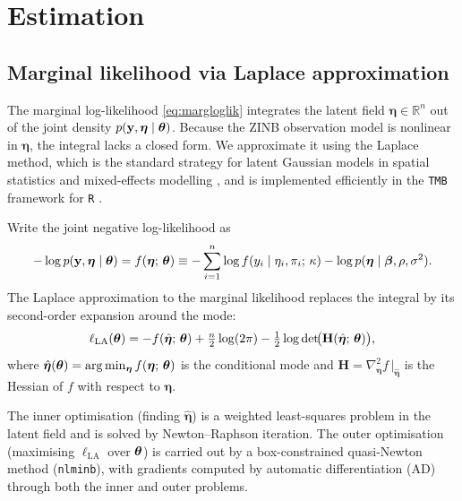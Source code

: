 \section{Estimation}\label{sec:estimation}

\subsection{Marginal likelihood via Laplace approximation}\label{sec:est_laplace}

The marginal log-likelihood \eqref{eq:margloglik} integrates the latent field $\boldsymbol{\eta} \in \mathbb{R}^n$ out of the joint density $p(\mathbf{y},\boldsymbol{\eta}\mid\boldsymbol{\theta})$.
Because the ZINB observation model is nonlinear in $\boldsymbol{\eta}$, the integral lacks a closed form.
We approximate it using the Laplace method, which is the standard strategy for latent Gaussian models in spatial statistics \citep{rue_martino_chopin2009} and mixed-effects modelling \citep{brooks2017}, and is implemented efficiently in the \texttt{TMB} framework for \texttt{R} \citep{kristensen2016}.

Write the joint negative log-likelihood as
\begin{equation}\label{eq:neg_joint}
  -\log p(\mathbf{y},\boldsymbol{\eta}\mid\boldsymbol{\theta}) = f(\boldsymbol{\eta};\,\boldsymbol{\theta}) \equiv
  -\sum_{i=1}^{n}\log f(y_i\mid\eta_i,\pi_i;\,\kappa)
  -\log p(\boldsymbol{\eta}\mid\boldsymbol{\beta},\rho,\sigma^2).
\end{equation}
The Laplace approximation to the marginal likelihood replaces the integral by its second-order expansion around the mode:
\begin{equation}\label{eq:laplace}
  \ell_{\mathrm{LA}}(\boldsymbol{\theta}) = -f(\hat{\boldsymbol{\eta}};\,\boldsymbol{\theta}) + \tfrac{n}{2}\log(2\pi) - \tfrac{1}{2}\log\det\!\bigl(\mathbf{H}(\hat{\boldsymbol{\eta}};\,\boldsymbol{\theta})\bigr),
\end{equation}
where $\hat{\boldsymbol{\eta}}(\boldsymbol{\theta}) = \arg\min_{\boldsymbol{\eta}} f(\boldsymbol{\eta};\,\boldsymbol{\theta})$ is the conditional mode and $\mathbf{H} = \nabla^2_{\boldsymbol{\eta}} f\,\big|_{\hat{\boldsymbol{\eta}}}$ is the Hessian of $f$ with respect to $\boldsymbol{\eta}$.

The inner optimisation (finding $\hat{\boldsymbol{\eta}}$) is a weighted least-squares problem in the latent field and is solved by Newton--Raphson iteration.
The outer optimisation (maximising $\ell_{\mathrm{LA}}$ over $\boldsymbol{\theta}$) is carried out by a box-constrained quasi-Newton method (\texttt{nlminb}), with gradients computed by automatic differentiation (AD) through both the inner and outer problems.

